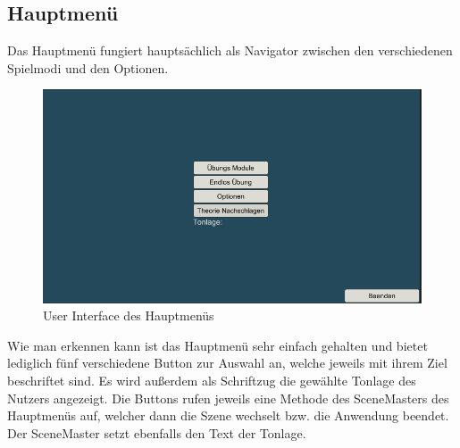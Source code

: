 \subsection*{Hauptmenü}
Das Hauptmenü fungiert hauptsächlich als Navigator zwischen den verschiedenen Spielmodi und den Optionen. 
\begin{figure}[H]
    \centering
    \includegraphics[width=1\textwidth]{Bilder/hauptmenue.png}
    \caption{User Interface des Hauptmenüs}
    \label{sec:hps_algo}
\end{figure}
Wie man erkennen kann ist das Hauptmenü sehr einfach gehalten und bietet lediglich fünf verschiedene Button zur Auswahl an, welche jeweils mit ihrem Ziel beschriftet sind. Es wird außerdem als Schriftzug die gewählte Tonlage des Nutzers angezeigt. Die Buttons rufen jeweils eine Methode des SceneMasters des Hauptmenüs auf, welcher dann die Szene wechselt bzw. die Anwendung beendet. Der SceneMaster setzt ebenfalls den Text der Tonlage. 

\newpage

